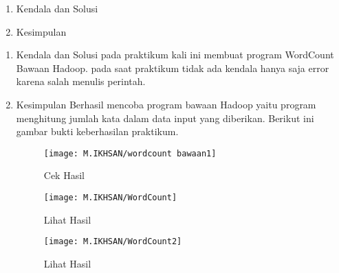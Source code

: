 \begin{enumerate}
\item Kendala dan Solusi


\item Kesimpulan

\end{enumerate}

\begin{enumerate}
\item Kendala dan Solusi
\newline pada praktikum kali ini membuat program WordCount Bawaan Hadoop. pada saat praktikum tidak ada kendala hanya saja error karena salah menulis perintah.

\item Kesimpulan
Berhasil mencoba program bawaan Hadoop yaitu program menghitung jumlah kata dalam data input yang diberikan. Berikut ini gambar bukti keberhasilan praktikum.

\begin{figure}[!ht]
\texttt{[image: M.IKHSAN/wordcount bawaan1]}
\caption{Cek Hasil}
\label{gam:Hadoop-version(M.IKHSAN)}
\end{figure}

\begin{figure}[!ht]
\texttt{[image: M.IKHSAN/WordCount]}
\caption{Lihat Hasil}
\label{gam:Hadoop-version(M.IKHSAN)}
\end{figure}
\begin{figure}[!ht]
\texttt{[image: M.IKHSAN/WordCount2]}
\caption{Lihat Hasil}
\label{gam:Hadoop-version(M.IKHSAN)}
\end{figure}
\end{enumerate}

